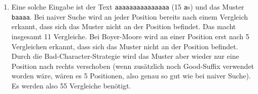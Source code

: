 \documentclass[11pt,a4paper]{article}
\begin{document}
\begin{loesung}
\begin{enumerate}
        \textbf{Horspool\textnormal{ (12 Vergleiche)}:}\\
        \begin{minipage}[t]{0.95\textwidth}
        \begin{Verbatim}[commandchars=\\\{\}]
DAS ENDE EINES LEBENS
LEBE\underline{N}
 LE\underline{B}\textbf{EN}
      LEBE\underline{N}
           LEBE\underline{N}
               \textbf{LEBEN}
                LEBE\underline{N}
        \end{Verbatim}
        \end{minipage} \\

        \textbf{Sunday\textnormal{ (13 Vergleiche)}:}\\
        \begin{minipage}[t]{0.95\textwidth}
        \begin{Verbatim}[commandchars=\\\{\}]
DAS ENDE EINES LEBENS
LEBE\underline{N}
 LE\underline{B}\textbf{EN}
       LEB\underline{E}\textbf{N}
         LEBE\underline{N}
               \textbf{LEBEN}
                LEBE\underline{N}
        \end{Verbatim}
        \end{minipage} \\

        \textbf{kombiniert\textnormal{ (13 Vergleiche)}:}\\
        \begin{minipage}[t]{0.95\textwidth}
        \begin{Verbatim}[commandchars=\\\{\}]
DAS ENDE EINES LEBENS
LEBE\underline{N}
 LE\underline{B}\textbf{EN}
       LEB\underline{E}\textbf{N}
            LEBE\underline{N}
               \textbf{LEBEN}
                LEBE\underline{N}
        \end{Verbatim}
        \end{minipage}

        \item
        Eine solche Eingabe ist der Text \texttt{aaaaaaaaaaaaaaa} (15 \texttt{a}s) und das Muster \texttt{baaaa}.
        Bei naiver Suche wird an jeder Position bereits nach einem Vergleich erkannt, dass sich das Muster nicht an der Position befindet.
        Das macht insgesamt 11 Vergleiche.
        Bei Boyer-Moore wird an einer Position erst nach 5 Vergleichen erkannt, dass sich das Muster nicht an der Position befindet.
        Durch die Bad-Character-Strategie wird das Muster aber wieder nur eine Position nach rechts verschoben (wenn zusätzlich noch Good-Suffix verwendet worden wäre, wären es 5 Positionen, also genau so gut wie bei naiver Suche).
        Es werden also 55 Vergleiche benötigt.


\end{enumerate}
\end{loesung}
\end{document}

